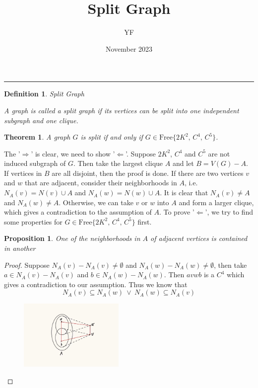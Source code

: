 \documentclass{article}
\title{\vspace{-2cm} Split Graph}
\author{YF}
\date{November 2023}
\newtheorem{definition}{Definition}
\newtheorem{theorem}{\bf Theorem}
\newtheorem{prop}{\bf Proposition}
\begin{document}
\maketitle
\hrule
\begin{definition}
    Split Graph
    
    A graph is called a split graph if its vertices can be split into one independent subgraph and one clique.
\end{definition}

\begin{theorem}
    A graph $G$ is split if and only if $G\in\text{Free}\{2K^2,\,C^4,\,C^5\}$.
\end{theorem}


    The '$\Rightarrow$' is clear, we need to show '$\Leftarrow$'. Suppose $2K^2$, $C^4$ and $C^5$ are not induced subgraph of $G$. Then take the largest clique $A$ and let $B=V(G)-A$. \\

    If vertices in $B$ are all disjoint, then the proof is done. If there are two vertices $v$ and $w$ that are adjacent, consider their neighborhoods in $A$, i.e. $N_A(v)=N(v)\cup A$ and $N_A(w)=N(w)\cup A$. It is clear that $N_A(v)\neq A$ and $N_A(w)\neq A$. Otherwise, we can take $v$ or $w$ into $A$ and form a larger clique, which gives a contradiction to the assumption of $A$. To prove '$\Leftarrow$', we try to find some properties for $G\in\text{Free}\{2K^2,\,C^4,\,C^5\}$ first.


    \begin{prop}\label{p2}
        One of the neighborhoods in $A$ of adjacent vertices is contained in another
    \end{prop}

    \begin{proof}
        Suppose $N_A(v)-N_A(v)\neq\emptyset$ and $N_A(w)-N_A(w)\neq\emptyset$, then take $a\in N_A(v)-N_A(v)$ and $b\in N_A(w)-N_A(w)$. Then $avwb$ is a $C^4$ which gives a contradiction to our assumption. Thus we know that
    \begin{equation*}
        N_A(v)\subseteq N_A(w)\ \vee\ N_A(w)\subseteq N_A(v)
    \end{equation*}
    \begin{figure}[h!]%
        \centering
        \includegraphics[width=0.45\textwidth]{pic/g1.jpg}
\end{figure}
    \end{proof}
\end{document}
